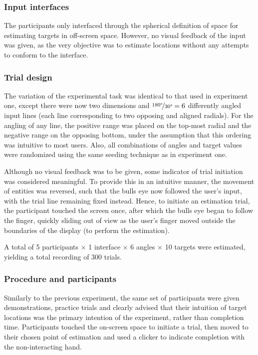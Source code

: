 \subsubsection{Input interfaces}

The participants only interfaced through the spherical definition of space for estimating targets in off-screen space. However, no visual feedback of the input was given, as the very objective was to estimate locations without any attempts to conform to the interface.

 
\subsubsection{Trial design}

The variation of the experimental task was identical to that used in experiment one, except there were now two dimensions and $\nicefrac{180\degree}{30\degree}=6$ differently angled input lines (each line corresponding to two opposing and aligned radials). For the angling of any line, the positive range was placed on the top-most radial and the negative range on the opposing bottom, under the assumption that this ordering was intuitive to most users. Also, all combinations of angles and target values were randomized using the same seeding technique as in experiment one.

Although no visual feedback was to be given, some indicator of trial initiation was considered meaningful. To provide this in an intuitive manner, the movement of entities was reversed, such that the bulls eye now followed the user's input, with the trial line remaining fixed instead. Hence, to initiate an estimation trial, the participant touched the screen once, after which the bulls eye began to follow the finger, quickly sliding out of view as the user's finger moved outside the boundaries of the display (to perform the estimation).

A total of 5 participants $\times$ 1 interface $\times$ 6 angles $\times$ 10 targets were estimated, yielding a total recording of 300 trials. %

\subsubsection{Procedure and participants}

Similarly to the previous experiment, the same set of participants were given demonstrations, practice trials and clearly advised that their intuition of target locations was the primary intention of the experiment, rather than completion time. Participants touched the on-screen space to initiate a trial, then moved to their chosen point of estimation and used a clicker to indicate completion with the non-interacting hand.

